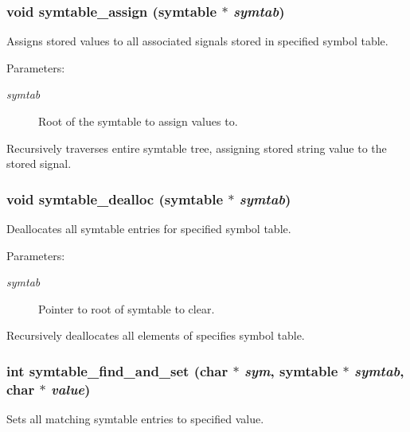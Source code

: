 \subsubsection{\setlength{\rightskip}{0pt plus 5cm}void symtable\_\-assign ({\bf symtable} $\ast$ {\em symtab})}\label{symtable_8h_a3}


Assigns stored values to all associated signals stored in specified symbol table.

\begin{Desc}
\item[Parameters:]
\begin{description}
\item[{\em symtab}]Root of the symtable to assign values to.\end{description}
\end{Desc}
Recursively traverses entire symtable tree, assigning stored string value to the stored signal. 
\subsubsection{\setlength{\rightskip}{0pt plus 5cm}void symtable\_\-dealloc ({\bf symtable} $\ast$ {\em symtab})}\label{symtable_8h_a4}


Deallocates all symtable entries for specified symbol table.

\begin{Desc}
\item[Parameters:]
\begin{description}
\item[{\em symtab}]Pointer to root of symtable to clear.\end{description}
\end{Desc}
Recursively deallocates all elements of specifies symbol table. 
\subsubsection{\setlength{\rightskip}{0pt plus 5cm}int symtable\_\-find\_\-and\_\-set (char $\ast$ {\em sym}, {\bf symtable} $\ast$ {\em symtab}, char $\ast$ {\em value})}\label{symtable_8h_a1}


Sets all matching symtable entries to specified value.

